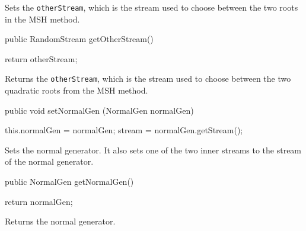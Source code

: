 \begin{tabb} Sets the \texttt{otherStream}, which is the stream used
to choose between the two roots in the MSH method.
\end{tabb}
\begin{code}

   public RandomStream getOtherStream() \begin{hide} {
        return otherStream;
    }\end{hide}
\end{code}
\begin{tabb} Returns the \texttt{otherStream}, which is the stream used
to choose between the two quadratic roots from the MSH method.
\end{tabb}
\begin{code}

   public void setNormalGen (NormalGen normalGen) \begin{hide} {
        this.normalGen = normalGen;
        stream = normalGen.getStream();
    }\end{hide}
\end{code}
\begin{tabb} Sets the normal generator.  It also sets one of the
two inner streams to the stream of the normal generator.
\end{tabb}
\begin{code}

   public NormalGen getNormalGen() \begin{hide} {
        return normalGen;
    }\end{hide}
\end{code}
\begin{tabb} Returns the normal generator.
\end{tabb}

